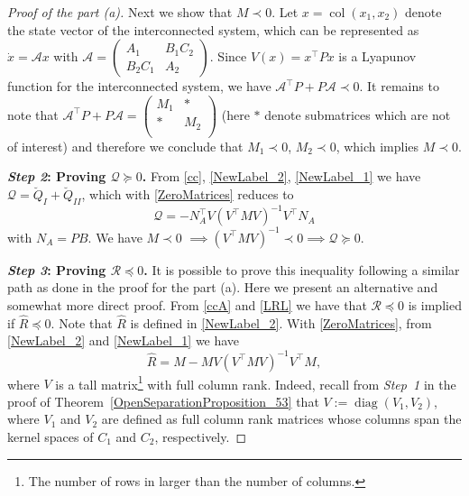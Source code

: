 \documentclass[11pt,a4paper,oneside,DIV=12,headings=small]{scrartcl}
\newcommand{\cQ}{\mathcal{Q}}
\newcommand{\cR}{\mathcal{R}}
\newcommand{\cA}{\mathcal{A}}
\newcommand{\diag}{\operatorname{diag}}
\newcommand{\col}{\operatorname{col}}
\theoremstyle{plain}
\begin{document}
\begin{proof}[Proof of the part (a)]
Next we show that $M\prec 0$. Let $x=\col(x_1,x_2)$ denote the state vector of the interconnected system, which can be represented as $\dot{x}=\cA x$ with $\cA=\left(\begin{smallmatrix} A_1 & B_1 C_2 \\ B_2 C_1 & A_2 \end{smallmatrix}\right)$. Since $V(x)=x^\top P x$ is a Lyapunov function for the interconnected system, we have $\cA^\top P + P \cA \prec 0$. It remains to note that $\cA^\top P + P \cA=\left(\begin{smallmatrix} M_1 & * \\ * & M_2 \\  \end{smallmatrix}\right)$ (here $*$ denote submatrices which are not of interest) and therefore we conclude that $M_1 \prec 0$, $M_2 \prec 0$, which implies $M \prec 0$.

\medskip

\textbf{\emph{Step 2}: Proving $\cQ\succeq 0$.} \newline
From \eqref{cc}, \eqref{NewLabel_2}, \eqref{NewLabel_1} we have $\cQ=\breve{Q}_I+\breve{Q}_{II}$, which with \eqref{ZeroMatrices} reduces to
\begin{equation}
\cQ=-N_A^\top V(V^\top M V)^{-1} V^\top N_A
\end{equation}
with $N_A=PB$. We have $M\prec 0 \,\, \implies (V^\top M V)^{-1} \prec 0 \implies \cQ \succeq 0$.

\medskip

\textbf{\emph{Step 3}: Proving $\cR\preceq 0$.} \newline
It is possible to prove this inequality following a similar path as done in the proof for the part (a). Here we present an alternative and somewhat more direct proof. From \eqref{ccA} and \eqref{LRL} we have that $\cR\preceq 0$ is implied if $\hat{R} \preceq 0$. Note that $\hat{R}$ is defined in \eqref{NewLabel_2}. With \eqref{ZeroMatrices}, from \eqref{NewLabel_2} and \eqref{NewLabel_1} we have
\begin{equation}
\label{hatR1}
\hat{R}=M-MV(V^\top M V)^{-1}V^\top M,
\end{equation}  
where $V$ is a tall matrix\footnote{The number of rows in larger than the number of columns.} with full column rank. Indeed, recall from \emph{Step~1} in the proof of Theorem~\ref{OpenSeparationProposition_53} that $V:=\diag(V_1,V_2)$, where $V_1$ and $V_2$ are defined as full column rank matrices whose columns span the kernel spaces of $C_1$ and $C_2$, respectively. 


\end{proof}
\end{document}

